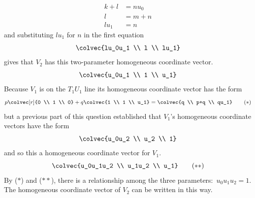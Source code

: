 \begin{exercises}
\begin{answer}
\begin{exparts}
\begin{equation*}
\begin{aligned}
              k+l  &= nu_0 \\
              l    &= m+n    \\
              lu_1 &= n
            \end{aligned}
           \end{equation*}
           and substituting $lu_1$ for $n$ in the first equation 
           \begin{equation*}
             \colvec{lu_0u_1 \\ l \\ lu_1}
           \end{equation*}
           gives that 
           $V_2$ has this two-parameter homogeneous coordinate vector.
           \begin{equation*}
             \colvec{u_0u_1 \\ 1 \\ u_1}
           \end{equation*}
        \partsitem
           Because $V_1$ is on the $T_1U_1$ line its
           homogeneous coordinate vector has the form
           \begin{equation*}
             p\colvec[r]{0 \\ 1 \\ 0}+q\colvec{1 \\ 1 \\ u_1}
             =\colvec{q \\ p+q \\ qu_1}
           \tag*{($*$)}\end{equation*}
           but a previous part of this question established that $V_1$'s
           homogeneous coordinate vectors have the form
           \begin{equation*}
            \colvec{u_0u_2 \\ u_2 \\ 1}             
           \end{equation*}
           and so this a homogeneous coordinate vector for $V_1$.
           \begin{equation*}
             \colvec{u_0u_1u_2 \\ u_1u_2 \\ u_1}             
           \tag*{($**$)}\end{equation*}
           By ($*$) and ($**$), there is a 
           relationship among the three parameters:~$u_0u_1u_2=1$.
         \partsitem  
           The homogeneous coordinate vector of $V_2$ can be written
           in this way.
           \begin{equation*}

\end{equation*}
\end{exparts}
\end{answer}
\end{exercises}
